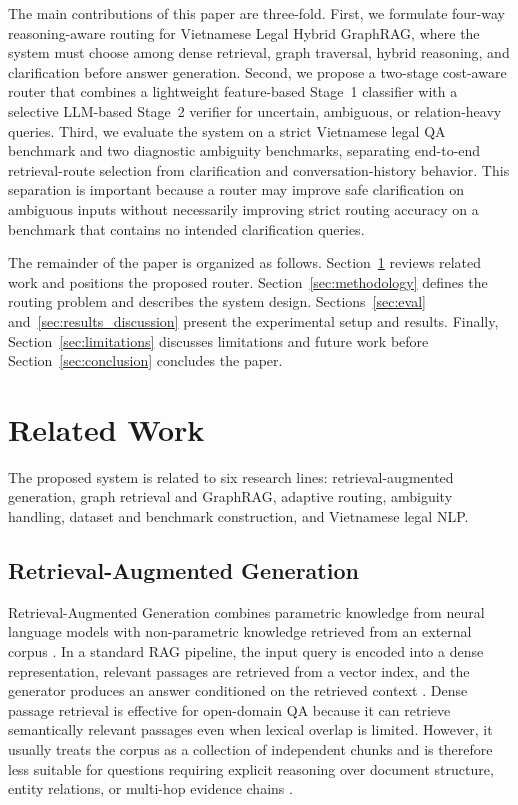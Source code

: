\documentclass[11pt,twocolumn]{article}
\begin{document}
The main contributions of this paper are three-fold. First,
we formulate four-way reasoning-aware routing for Vietnamese
Legal Hybrid GraphRAG, where the system must choose among
dense retrieval, graph traversal, hybrid reasoning, and
clarification before answer generation. Second, we propose a
two-stage cost-aware router that combines a lightweight
feature-based Stage~1 classifier with a selective LLM-based
Stage~2 verifier for uncertain, ambiguous, or relation-heavy
queries. Third, we evaluate the system on a strict Vietnamese
legal QA benchmark and two diagnostic ambiguity benchmarks,
separating end-to-end retrieval-route selection from
clarification and conversation-history behavior. This
separation is important because a router may improve safe
clarification on ambiguous inputs without necessarily
improving strict routing accuracy on a benchmark that
contains no intended clarification queries.

The remainder of the paper is organized as follows.
Section~\ref{sec:related_work} reviews related work and
positions the proposed router. Section~\ref{sec:methodology}
defines the routing problem and describes the system design.
Sections~\ref{sec:eval} and~\ref{sec:results_discussion}
present the experimental setup and results. Finally,
Section~\ref{sec:limitations} discusses limitations and
future work before Section~\ref{sec:conclusion} concludes the
paper.

\section{Related Work}
\label{sec:related_work}

The proposed system is related to six research lines:
retrieval-augmented generation, graph retrieval and
GraphRAG, adaptive routing, ambiguity handling, dataset and
benchmark construction, and Vietnamese legal NLP.

\subsection{Retrieval-Augmented Generation}

Retrieval-Augmented Generation combines parametric
knowledge from neural language models with non-parametric
knowledge retrieved from an external corpus
\cite{lewis2020rag,guu2020realm}. In a standard RAG
pipeline, the input query is encoded into a dense
representation, relevant passages are retrieved from a
vector index, and the generator produces an answer
conditioned on the retrieved context \cite{karpukhin2020dpr}.
Dense passage retrieval is effective for open-domain QA
because it can retrieve semantically relevant passages even
when lexical overlap is limited. However, it usually treats
the corpus as a collection of independent chunks and is
therefore less suitable for questions requiring explicit
reasoning over document structure, entity relations, or
multi-hop evidence chains
\cite{trivedi2023interleaving,press2023measuring}.
\end{document}
